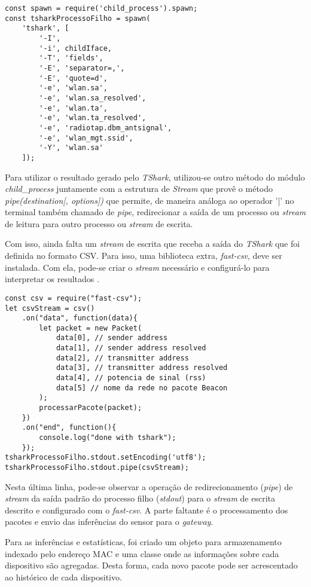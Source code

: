 \begin{lstlisting}
const spawn = require('child_process').spawn;
const tsharkProcessoFilho = spawn(
	'tshark', [
		'-I',
		'-i', childIface,
		'-T', 'fields',
		'-E', 'separator=,',
		'-E', 'quote=d',
		'-e', 'wlan.sa',
		'-e', 'wlan.sa_resolved',
		'-e', 'wlan.ta',
		'-e', 'wlan.ta_resolved',
		'-e', 'radiotap.dbm_antsignal',
		'-e', 'wlan_mgt.ssid',
		'-Y', 'wlan.sa'
	]);
\end{lstlisting}

Para utilizar o resultado gerado pelo \emph{TShark}, utilizou-se outro método do
módulo \emph{child\_process} juntamente com a estrutura de \emph{Stream}
\cite{stream} que provê o método \emph{pipe(destination[, options])} que permite,
de maneira análoga ao operador '|' no terminal também chamado de \emph{pipe},
redirecionar a saída de um processo ou \emph{stream} de leitura para outro
processo ou \emph{stream} de escrita.

Com isso, ainda falta um \emph{stream} de escrita que receba a saída do
\emph{TShark} que foi definida no formato CSV. Para isso, uma biblioteca extra,
\emph{fast-csv}, deve ser instalada. Com ela, pode-se criar o \emph{stream}
necessário e configurá-lo para interpretar os resultados \cite{fast-csv}.

\begin{lstlisting}
const csv = require("fast-csv");
let csvStream = csv()
	.on("data", function(data){
		let packet = new Packet(
			data[0], // sender address
			data[1], // sender address resolved
			data[2], // transmitter address
			data[3], // transmitter address resolved
			data[4], // potencia de sinal (rss)
			data[5] // nome da rede no pacote Beacon
		);
		processarPacote(packet);
	})
	.on("end", function(){
		console.log("done with tshark");
	});
tsharkProcessoFilho.stdout.setEncoding('utf8');
tsharkProcessoFilho.stdout.pipe(csvStream);
\end{lstlisting}

Nesta última linha, pode-se observar a operação de redirecionamento (\emph{pipe})
de \emph{stream} da saída padrão do processo filho (\emph{stdout}) para o
\emph{stream} de escrita descrito e configurado com o \emph{fast-csv}. A parte
faltante é o processamento dos pacotes e envio das inferências do sensor para o
\emph{gateway}.

Para as inferências e estatísticas, foi criado um objeto para armazenamento indexado
pelo endereço MAC e uma classe onde as informações
sobre cada dispositivo são agregadas. Desta forma, cada novo pacote pode ser acrescentado ao
histórico de cada dispositivo.


